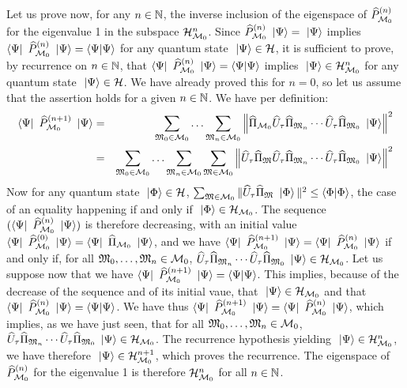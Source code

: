  Let us prove now, for any $n \in \IN$, the inverse inclusion of the eigenspace of $\op P_{\CMS_0}^{(n)}$ for the eigenvalue 1 in the subspace $\H_{\CMS_0}^n$. Since $\op P_{\CMS_0}^{(n)} \ket \Psi = \ket \Psi$ implies $\bra \Psi \op P_{\CMS_0}^{(n)} \ket \Psi = \braket \Psi \Psi$ for any quantum state $\ket \Psi \in \H$, it is sufficient to prove, by recurrence on $n \in \IN$, that $\bra \Psi \op P_{\CMS_0}^{(n)} \ket \Psi = \braket \Psi \Psi$ implies $\ket \Psi \in \H_{\CMS_0}^n$ for any quantum state $\ket \Psi \in \H$. We have already proved this for $n = 0$, so let us assume that the assertion holds for a given $n \in \IN$. We have per definition:
\begin{eqnarray*}
\bra \Psi \op P_{\CMS_0}^{(n+1)} \ket \Psi & = & \sum_{\cms_0 \in \CMS_0} \dotsc \sum_{\cms_n \in \CMS_0} \left\| \op \Pi_{\CMS_0} \op U_\tau \op \Pi_{\cms_n} \dotsm \op U_\tau \op \Pi_{\cms_0} \ket \Psi \right\|^2 \\
& = & \sum_{\cms_0 \in \CMS_0} \dotsc \sum_{\cms_n \in \CMS_0} \sum_{\cms \in \CMS_0} \left\| \op U_\tau \op \Pi_\cms \op U_\tau \op \Pi_{\cms_n} \dotsm \op U_\tau \op \Pi_{\cms_0} \ket \Psi \right\|^2
\end{eqnarray*}
Now for any quantum state $\ket \Phi \in \H$, $\sum_{\cms \in \CMS_0} \| \op U_\tau \op \Pi_\cms \ket \Phi \|^2 \leq \braket \Phi \Phi$, the case of an equality happening if and only if $\ket \Phi \in \H_{\CMS_0}$. The sequence $(\bra \Psi \op P_{\CMS_0}^{(n)} \ket \Psi)$ is therefore decreasing, with an initial value $\bra \Psi \op P_{\CMS_0}^{(0)} \ket \Psi = \bra \Psi \op \Pi_{\CMS_0} \ket \Psi$, and we have $\bra \Psi \op P_{\CMS_0}^{(n+1)} \ket \Psi = \bra \Psi \op P_{\CMS_0}^{(n)} \ket \Psi$ if and only if, for all $\cms_0, \dotsc, \cms_n \in \CMS_0$, $\op U_\tau \op \Pi_{\cms_n} \dotsm \op U_\tau \op \Pi_{\cms_0} \ket \Psi \in \H_{\CMS_0}$. Let us suppose now that we have $\bra \Psi \op P_{\CMS_0}^{(n+1)} \ket \Psi = \braket \Psi \Psi$. This implies, because of the decrease of the sequence and of its initial vaue, that $\ket \Psi \in \H_{\CMS_0}$ and that $\bra \Psi \op P_{\CMS_0}^{(n)} \ket \Psi = \braket \Psi \Psi$. We have thus $\bra \Psi \op P_{\CMS_0}^{(n+1)} \ket \Psi = \bra \Psi \op P_{\CMS_0}^{(n)} \ket \Psi$, which implies, as we have just seen, that for all $\cms_0, \dotsc, \cms_n \in \CMS_0$, $\op U_\tau \op \Pi_{\cms_n} \dotsm \op U_\tau \op \Pi_{\cms_0} \ket \Psi \in \H_{\CMS_0}$. The recurrence hypothesis yielding $\ket \Psi \in \H_{\CMS_0}^n$, we have therefore $\ket \Psi \in \H_{\CMS_0}^{n+1}$, which proves the recurrence. The eigenspace of $\op P_{\CMS_0}^{(n)}$ for the eigenvalue 1 is therefore $\H_{\CMS_0}^n$ for all $n \in \IN$.

